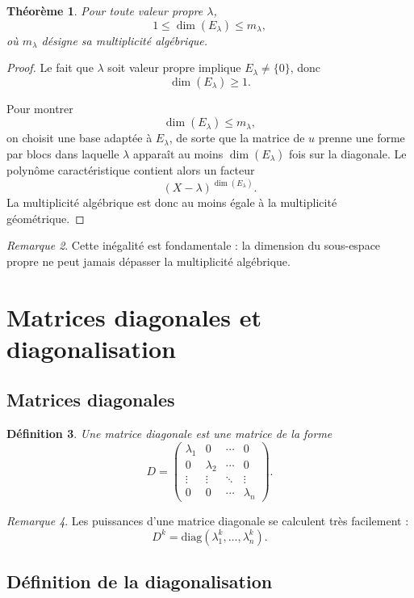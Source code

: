 \documentclass[11pt,a4paper]{article}
\newtheorem{definition}{Définition}[section]
\newtheorem{theoreme}[definition]{Théorème}
\theoremstyle{remark}
\newtheorem{remarque}[definition]{Remarque}
\newcommand{\diag}{\mathrm{diag}}
\begin{document}
\begin{theoreme}
Pour toute valeur propre \(\lambda\),
\[
1\le \dim(E_\lambda)\le m_\lambda,
\]
où \(m_\lambda\) désigne sa multiplicité algébrique.
\end{theoreme}

\begin{proof}
Le fait que \(\lambda\) soit valeur propre implique \(E_\lambda\neq \{0\}\), donc
\[
\dim(E_\lambda)\ge 1.
\]

Pour montrer
\[
\dim(E_\lambda)\le m_\lambda,
\]
on choisit une base adaptée à \(E_\lambda\), de sorte que la matrice de \(u\) prenne une forme par blocs dans laquelle \(\lambda\) apparaît au moins \(\dim(E_\lambda)\) fois sur la diagonale. Le polynôme caractéristique contient alors un facteur
\[
(X-\lambda)^{\dim(E_\lambda)}.
\]
La multiplicité algébrique est donc au moins égale à la multiplicité géométrique.
\end{proof}

\begin{remarque}
Cette inégalité est fondamentale : la dimension du sous-espace propre ne peut jamais dépasser la multiplicité algébrique.
\end{remarque}

\section{Matrices diagonales et diagonalisation}

\subsection{Matrices diagonales}

\begin{definition}
Une matrice diagonale est une matrice de la forme
\[
D=
\begin{pmatrix}
\lambda_1 & 0 & \cdots & 0\\
0 & \lambda_2 & \cdots & 0\\
\vdots & \vdots & \ddots & \vdots\\
0 & 0 & \cdots & \lambda_n
\end{pmatrix}.
\]
\end{definition}

\begin{remarque}
Les puissances d’une matrice diagonale se calculent très facilement :
\[
D^k=\diag(\lambda_1^k,\dots,\lambda_n^k).
\]
\end{remarque}

\subsection{Définition de la diagonalisation}
\end{document}
